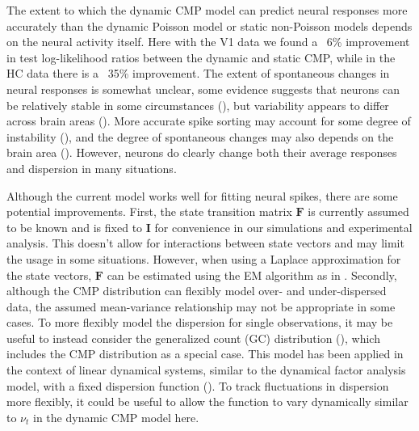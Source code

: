 \documentclass[aoas]{imsart}
\theoremstyle{plain}
\theoremstyle{remark}
\begin{document}
The extent to which the dynamic CMP model can predict neural responses more accurately than the dynamic Poisson model or static non-Poisson models depends on the neural activity itself. Here with the V1 data we found a ~6\% improvement in test log-likelihood ratios between the dynamic and static CMP, while in the HC data there is a ~35\% improvement. The extent of spontaneous changes in neural responses is somewhat unclear, some evidence suggests that neurons can be relatively stable in some circumstances (\cite{Chestek2007,Stevenson2011a,Dickey2009}), but variability appears to differ across brain areas (\cite{Mochizuki2016}). More accurate spike sorting may account for some degree of instability (\cite{Steinmetz2021}), and the degree of spontaneous changes may also depends on the brain area (\cite{Rule2019}). However, neurons do clearly change both their average responses and dispersion in many situations.

Although the current model works well for fitting neural spikes, there are some potential improvements. First, the state transition matrix $\bm{F}$ is currently assumed to be known and is fixed to $\bm{I}$ for convenience in our simulations and experimental analysis. This doesn’t allow for interactions between state vectors and may limit the usage in some situations. However, when using a Laplace approximation for the state vectors, $\bm{F}$ can be estimated using the EM algorithm as in \cite{Macke2011}. Secondly, although the CMP distribution can flexibly model over- and under-dispersed data, the assumed mean-variance relationship may not be appropriate in some cases. To more flexibly model the dispersion for single observations, it may be useful to instead consider the generalized count (GC) distribution (\cite{DelCastillo2005}), which includes the CMP distribution as a special case. This model has been applied in the context of linear dynamical systems, similar to the dynamical factor analysis model,  with a fixed dispersion function (\cite{Gao2015}). To track fluctuations in dispersion more flexibly, it could be useful to allow the function to vary dynamically similar to $\nu_t$ in the dynamic CMP model here.
\end{document}
